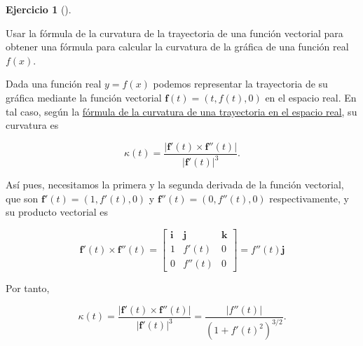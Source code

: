 \documentclass[
  a4paper,
]{scrreport}
\theoremstyle{definition}
\newtheorem{exercise}{Ejercicio}[chapter]
\theoremstyle{remark}
\begin{document}
\begin{exercise}[]\protect\hypertarget{exr-curvatura-funcion}{}\label{exr-curvatura-funcion}

Usar la fórmula de la curvatura de la trayectoria de una función
vectorial para obtener una fórmula para calcular la curvatura de la
gráfica de una función real \(f(x)\).

\end{exercise}

\begin{tcolorbox}[enhanced jigsaw, left=2mm, coltitle=black, colbacktitle=quarto-callout-tip-color!10!white, opacitybacktitle=0.6, colback=white, breakable, titlerule=0mm, toptitle=1mm, rightrule=.15mm, bottomtitle=1mm, bottomrule=.15mm, toprule=.15mm, leftrule=.75mm, arc=.35mm, opacityback=0, title=\textcolor{quarto-callout-tip-color}{\faLightbulb}\hspace{0.5em}{Solución}, colframe=quarto-callout-tip-color-frame]

Dada una función real \(y=f(x)\) podemos representar la trayectoria de
su gráfica mediante la función vectorial
\(\mathbf{f}(t) = (t, f(t), 0)\) en el espacio real. En tal caso, según
la
\href{https://aprendeconalf.es/analisis-manual/12-funciones-vectoriales.html\#thm-curvatura-trayectoria-espacio-real}{fórmula
de la curvatura de una trayectoria en el espacio real}, su curvatura es

\[
\kappa(t)= \frac{|\mathbf{f}'(t)\times \mathbf{f}''(t)|}{|\mathbf{f}'(t)|^3}.
\]

Así pues, necesitamos la primera y la segunda derivada de la función
vectorial, que son \(\mathbf{f}'(t)=(1,f'(t),0)\) y
\(\mathbf{f}''(t) = (0, f''(t), 0)\) respectivamente, y su producto
vectorial es

\[
\mathbf{f}'(t)\times \mathbf{f}''(t) 
= 
\begin{bmatrix}
\mathbf{i} & \mathbf{j} & \mathbf{k}\\
1 & f'(t) & 0\\
0 & f''(t) & 0 
\end{bmatrix}
= f''(t)\mathbf{j}
\]

Por tanto,

\[
\kappa(t)= \frac{|\mathbf{f}'(t)\times \mathbf{f}''(t)|}{|\mathbf{f}'(t)|^3}
= \frac{|f''(t)|}{(1+f'(t)^2)^{3/2}}.
\]

\end{tcolorbox}
\end{document}
